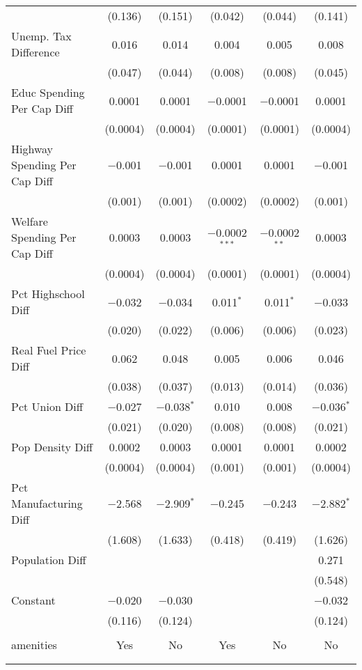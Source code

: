 \begin{table}[!htbp]
\begin{tabular}{@{\extracolsep{5pt}}lccccc}
  & (0.136) & (0.151) & (0.042) & (0.044) & (0.141) \\ 
  Unemp. Tax Difference & 0.016 & 0.014 & 0.004 & 0.005 & 0.008 \\ 
  & (0.047) & (0.044) & (0.008) & (0.008) & (0.045) \\ 
  Educ Spending Per Cap Diff & 0.0001 & 0.0001 & $-$0.0001 & $-$0.0001 & 0.0001 \\ 
  & (0.0004) & (0.0004) & (0.0001) & (0.0001) & (0.0004) \\ 
  Highway Spending Per Cap Diff & $-$0.001 & $-$0.001 & 0.0001 & 0.0001 & $-$0.001 \\ 
  & (0.001) & (0.001) & (0.0002) & (0.0002) & (0.001) \\ 
  Welfare Spending Per Cap Diff & 0.0003 & 0.0003 & $-$0.0002$^{***}$ & $-$0.0002$^{**}$ & 0.0003 \\ 
  & (0.0004) & (0.0004) & (0.0001) & (0.0001) & (0.0004) \\ 
  Pct Highschool Diff & $-$0.032 & $-$0.034 & 0.011$^{*}$ & 0.011$^{*}$ & $-$0.033 \\ 
  & (0.020) & (0.022) & (0.006) & (0.006) & (0.023) \\ 
  Real Fuel Price Diff & 0.062 & 0.048 & 0.005 & 0.006 & 0.046 \\ 
  & (0.038) & (0.037) & (0.013) & (0.014) & (0.036) \\ 
  Pct Union Diff & $-$0.027 & $-$0.038$^{*}$ & 0.010 & 0.008 & $-$0.036$^{*}$ \\ 
  & (0.021) & (0.020) & (0.008) & (0.008) & (0.021) \\ 
  Pop Density Diff & 0.0002 & 0.0003 & 0.0001 & 0.0001 & 0.0002 \\ 
  & (0.0004) & (0.0004) & (0.001) & (0.001) & (0.0004) \\ 
  Pct Manufacturing Diff & $-$2.568 & $-$2.909$^{*}$ & $-$0.245 & $-$0.243 & $-$2.882$^{*}$ \\ 
  & (1.608) & (1.633) & (0.418) & (0.419) & (1.626) \\ 
  Population Diff &  &  &  &  & 0.271 \\ 
  &  &  &  &  & (0.548) \\ 
  Constant & $-$0.020 & $-$0.030 &  &  & $-$0.032 \\ 
  & (0.116) & (0.124) &  &  & (0.124) \\ 
 \hline \\[-1.8ex] 
amenities & Yes & No & Yes & No & No \\ 
\hline \\[-1.8ex] 
\hline 
\hline \\[-1.8ex] 
\end{tabular} 
\end{table} 

